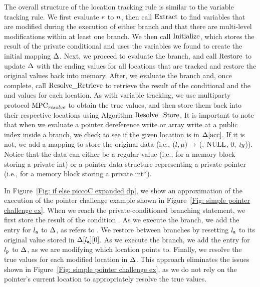 The overall structure of the location tracking rule is similar to the variable tracking rule. 
We first evaluate $e$ to $n$, then call $\mathrm{ Extract}$ to find variables that are modified during the execution of either branch and that there are multi-level modifications within at least one branch. 
We then call $\mathrm{ Initialize}$, which stores the result of the private conditional and uses the variables we found to create the initial mapping $\Delta$.  
Next, we proceed to evaluate the  branch, and call $\mathrm{ Restore}$ to update $\Delta$ with the ending  values for all locations that are tracked and restore the original values back into memory. 
After, we evaluate the  branch and, once complete, call $\mathrm{ Resolve\_Retrieve}$ to retrieve the result of the conditional and the  and  values for each location. 
As with variable tracking, we use multiparty protocol $\mathrm{MPC}_\mathit{{resolve}}$ to obtain the true values, and then store them back into their respective locations using Algorithm $\mathrm{ Resolve\_Store}$. 
%
It is important to note that when we evaluate a pointer dereference write or array write at a public index inside a branch, we check to see if the given location is in $\Delta[\mathrm{acc}]$.  If it is not, we add a mapping to store the original data (i.e., $(l, \mu) \to$ (, $\mathrm{NULL}$, $0$, $\mathit{ty}$)). Notice that the data can either be a regular value (i.e., for a memory block storing a private int) or a pointer data structure representing a private pointer (i.e., for a memory block storing a private int*). 

In Figure~\ref{Fig: if else piccoC expanded dp}, we show an approximation of the execution of the pointer challenge example shown in Figure~\ref{Fig: simple pointer challenge ex}. 
When we reach the private-conditioned branching statement, we first store the result of the condition . As we execute the  branch, we add the entry for $l_{\texttt{a}}$ to $\Delta$, as  refers to . We restore between branches by resetting $l_{\texttt{a}}$ to its original value stored in $\Delta[l_{\texttt{a}}][0]$. As we execute the  branch, we add the entry for $l_{\texttt{p}}$ to $\Delta$, as we are modifying which location  points to. Finally, we resolve the true values for each modified location in $\Delta$. This approach eliminates the issues shown in Figure~\ref{Fig: simple pointer challenge ex}, as we do not rely on the pointer's current location to appropriately resolve the true values. 







